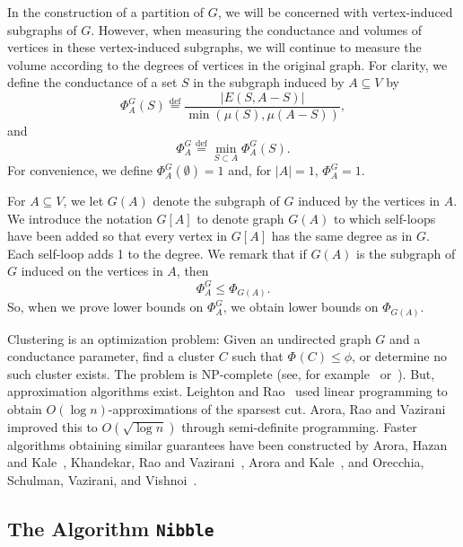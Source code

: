\documentclass[11pt]{article}
\def\defeq{\stackrel{\mathrm{def}}{=}}
\def\sizeof#1{\left|#1  \right|}
\def\conduc#1#2{\Phi_{#1}\left(#2  \right)}
\def\conducin#1#2{\Phi^{G}_{#1}\left(#2  \right)}
\def\Conduc#1{\Phi_{#1}}
\def\Conducin#1{\Phi^{G}_{#1}}
\def\vol#1{\mu \left(#1  \right)}
\begin{document}
In the construction of a partition of $G$, we will be concerned with
  vertex-induced subgraphs of $G$.
However, when measuring the conductance and volumes of vertices in
  these vertex-induced subgraphs, we will continue to measure the
  volume according to the degrees of vertices in the original graph.
For clarity, we define the conductance of a set $S$ in the subgraph induced
  by $A \subseteq V$ by
\[
  \conducin{A}{S} \defeq
  \frac{\sizeof{E (S, A - S)}}
       {\min \left(\vol{S}, \vol{A - S} \right)},
\]
and
\[
  \Conducin{A}{}
   \defeq \min_{S \subset A} \conducin{A}{S}.
\]
For convenience, we define $\conducin{A}{\emptyset} = 1$ and, for $\sizeof{A} = 1$,
  $\Conducin{A}{} = 1$.

For $A \subseteq V$, we let $G (A)$ denote the subgraph of $G$ induced by
  the vertices in $A$.
We introduce the notation $G[A]$ to denote graph $G (A)$ to which self-loops
  have been added so that every vertex in $G[A]$ has the same degree
  as in $G$.
Each self-loop adds 1 to the degree.
We remark that if $G (A)$ is the subgraph of $G$ induced on the
  vertices in $A$, then
\[
  \Conducin{A}{} \leq     \Conduc{G (A)}{}.
\]
So, when we prove lower bounds on $ \Conducin{A}{}$, we obtain lower
  bounds on $ \Conduc{G (A)}{}$.

Clustering is an optimization problem:
Given an undirected graph $G$ and
   a conductance parameter, find a cluster $C$ such that
   $\conduc{}{C} \leq \phi$, or determine no such cluster exists.
The problem is  NP-complete (see, for example~\cite{LeightonRao}
  or~\cite{NPcompleteCluster}).
But, approximation algorithms exist.
Leighton and Rao~\cite{LeightonRao} used linear programming to obtain
 $O (\log n)$-approximations of the sparsest cut.
Arora, Rao and Vazirani~\cite{AroraRaoVazirani} improved this to $O (\sqrt{\log n})$
  through semi-definite programming.
Faster algorithms obtaining similar guarantees have been constructed by
  Arora, Hazan and Kale~\cite{AroraHazanKale},
  Khandekar, Rao and Vazirani~\cite{KhandekarRaoVazirani},
  Arora and Kale~\cite{AroraKale}, and
  Orecchia, Schulman, Vazirani, and Vishnoi~\cite{Orecchia}.



\subsection{The Algorithm \texttt{Nibble}}
\end{document}
